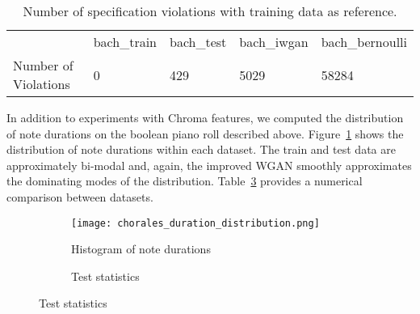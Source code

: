 \begin{table}[!h]
\centering
\begin{tabular}{lllll}
& \cellcolor[HTML]{C0C0C0}bach\_train & \cellcolor[HTML]{C0C0C0}bach\_test & \cellcolor[HTML]{C0C0C0}bach\_iwgan & \cellcolor[HTML]{C0C0C0}bach\_bernoulli \\ \cline{2-5} 
\multicolumn{1}{l|}{\cellcolor[HTML]{C0C0C0}Number of Violations} & 0                                   & 429                                & 5029                                & 58284                                  
\end{tabular}
\caption{Number of specification violations with training data as
    reference.}
\label{tbl:chroma_violations}
\end{table}

In addition to experiments with Chroma features, we computed the distribution of
note durations on the boolean piano roll described above.
Figure~\ref{fig:chorales_duration_distribution} shows the distribution of
note durations within each dataset. The train and test data are approximately
bi-modal and, again, the improved WGAN smoothly approximates the
dominating modes of the distribution. Table~\ref{tbl:duration} provides a numerical 
comparison between datasets.


\begin{figure}[!h]
    \begin{subfigure}[b]{0.65\textwidth}
        \texttt{[image: chorales\_duration\_distribution.png]}
        \caption{Histogram of note durations}
        \label{fig:chorales_duration_distribution}
    \end{subfigure}
    \quad
    \begin{subfigure}[b]{0.3\textwidth}
        \caption{Test statistics}
        \label{tbl:duration}
    \end{subfigure}
\end{figure}

